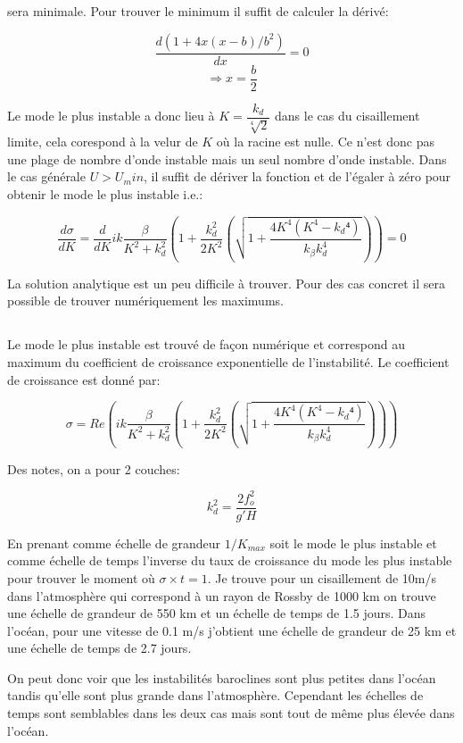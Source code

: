 \documentclass[11pt,a4paper,titlepage]{article}
\begin{document}
sera minimale. Pour trouver le minimum il suffit de calculer la dérivé:

\begin{equation}
\dfrac{d (1 + 4 x (x-b)/b^2
)}{dx} = 0
\end{equation}
\begin{equation} 
\Rightarrow x=\dfrac{b}{2}
\end{equation}

Le mode le plus instable a donc lieu à $K=\dfrac{k_d}{\sqrt[4]{2}}$ dans le cas du cisaillement limite, cela corespond à la velur de $K$ où la racine est nulle. Ce n'est donc pas une plage de nombre d'onde instable mais un seul nombre d'onde instable. Dans le cas générale $U>U_min$, il suffit de dériver la fonction et de l'égaler à zéro pour obtenir le mode le plus instable i.e.:

\begin{equation}
\dfrac{d\sigma}{dK}=\dfrac{d}{dK}ik\dfrac{\beta}{K^2+k_d^2}\left(1+\dfrac{k_d^2}{2K^2}\left(\sqrt{1+\dfrac{4K^4(K^4-k_d⁴)}{k_{\beta}k_d^4}}\right)\right) = 0
\end{equation} 

La solution analytique est un peu difficile à trouver. Pour des cas concret il sera possible de trouver numériquement les maximums.

\subsection{}

Le mode le plus instable est trouvé de façon numérique et correspond au maximum du coefficient de croissance exponentielle de l'instabilité. Le coefficient de croissance est donné par:

\begin{equation}
\sigma=Re(ik\dfrac{\beta}{K^2+k_d^2}\left(1+\dfrac{k_d^2}{2K^2}\left(\sqrt{1+\dfrac{4K^4(K^4-k_d⁴)}{k_{\beta}k_d^4}}\right)\right)) 
\end{equation} 


Des notes, on a pour 2 couches:

\begin{equation}
k_d^2 =\dfrac{2f_o^2}{g'H}
\end{equation}

En prenant comme échelle de grandeur $1/K_{max}$ soit le mode le plus instable et comme échelle de temps l'inverse du taux de croissance du mode les plus instable pour trouver le moment où $\sigma \times t = 1$. Je trouve pour un cisaillement de 10m/s dans l'atmosphère qui correspond à un rayon de Rossby de 1000 km on trouve une échelle de grandeur de 550 km et un échelle de temps de 1.5 jours. Dans l'océan, pour une vitesse de 0.1 m/s j'obtient une échelle de grandeur de 25 km et une échelle de temps de 2.7 jours. 

On peut donc voir que les instabilités baroclines sont plus petites dans l'océan tandis qu'elle sont plus grande dans l'atmosphère. Cependant les échelles de temps sont semblables dans les deux cas mais sont tout de même plus élevée dans l'océan.  
\end{document}

